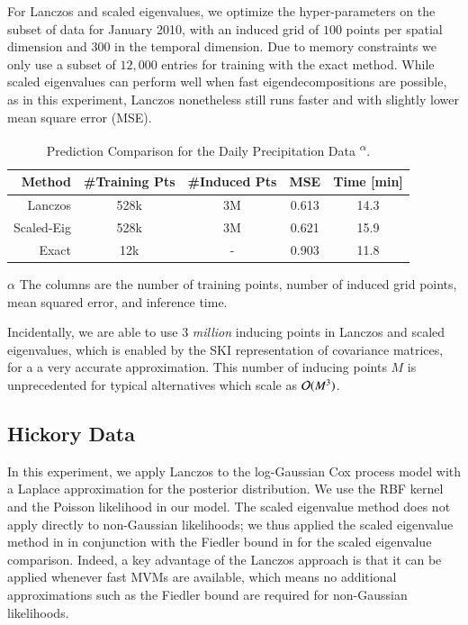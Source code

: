 For Lanczos and scaled eigenvalues, we optimize the hyper\hyp{}parameters on the
subset of data for January 2010, with an induced grid of $100$ points per
spatial dimension and $300$ in the temporal dimension. Due to memory constraints
we only use a subset of $12,000$ entries for training with the exact method.
While scaled eigenvalues can perform well when fast eigendecompositions are
possible, as in this experiment, Lanczos nonetheless still runs faster and with
slightly lower mean square error (MSE).

\begin{table}[ht]
  \centering
  \caption{Prediction Comparison for the Daily Precipitation Data
  \textsuperscript{$\alpha$}.}\label{tab:precip}
  \begin{threeparttable}
    \begin{tabular}{r c c c c}
      \toprule
      Method  & \#Training Pts   & \#Induced Pts & MSE & Time [min]\\ \midrule
      Lanczos & 528k  & 3M  & 0.613 &  14.3\\
      Scaled\hyp{}Eig & 528k  & 3M  & 0.621 &  15.9\\
      Exact   & 12k   & -   & 0.903 &  11.8\\
      \bottomrule
    \end{tabular}
    \begin{tablenotes}
      \item[$\alpha$] The columns are the number of training points, number of
      induced grid points, mean squared error, and inference time.
    \end{tablenotes}
  \end{threeparttable}
\end{table}
Incidentally, we are able to use 3 \emph{million} inducing points in Lanczos and
scaled eigenvalues, which is enabled by the SKI representation 
\citep{wilson2015kernel} of covariance matrices, for a a very accurate
approximation.  This number of inducing points $M$ is unprecedented for typical
alternatives which scale as $\mathcal{O}(M^3)$.

\subsection{Hickory Data}

In this experiment, we apply Lanczos to the log\hyp{}Gaussian Cox process model
with a Laplace approximation for the posterior distribution. We use the RBF
kernel and the Poisson likelihood in our model.  The scaled eigenvalue method
does not apply directly to non\hyp{}Gaussian likelihoods; we thus applied the
scaled eigenvalue method in \citep{wilson2015kernel} in conjunction with the
Fiedler bound in \citep{flaxman2015fast} for the scaled eigenvalue comparison. 
Indeed, a key advantage of the Lanczos approach is that it can be applied
whenever fast MVMs are available, which means no additional approximations such
as the Fiedler bound are required for non\hyp{}Gaussian likelihoods.

